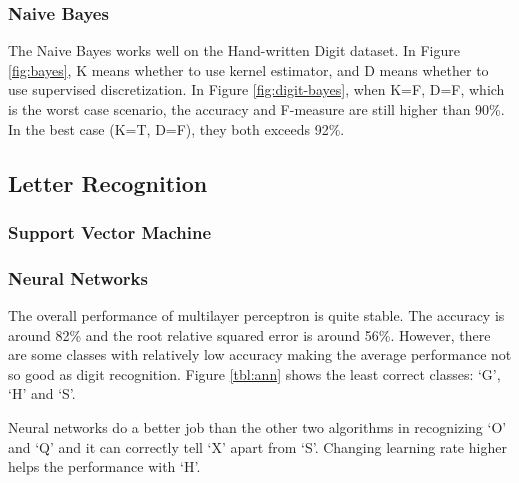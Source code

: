 \documentclass[11pt]{article}
\begin{document}
\subsubsection{Naive Bayes}
The Naive Bayes works well on the Hand-written Digit dataset. In Figure \ref{fig:bayes}, K means whether to use kernel estimator, and D means whether to use supervised discretization. In Figure \ref{fig:digit-bayes}, when K=F, D=F, which is the worst case scenario, the accuracy and F-measure are still higher than 90\%. In the best case (K=T, D=F), they both exceeds 92\%.

\subsection{Letter Recognition}
\subsubsection{Support Vector Machine}

\subsubsection{Neural Networks}
The overall performance of multilayer perceptron is quite stable. The accuracy is around 82\% and the root relative squared error is around 56\%. However, there are some classes with relatively low accuracy making the average performance not so good as digit recognition. Figure \ref{tbl:ann} shows the least correct classes: `G', `H' and `S'.

Neural networks do a better job than the other two algorithms in recognizing `O' and `Q' and it can correctly tell `X' apart from `S'. Changing learning rate higher helps the performance with `H'.
\end{document}
